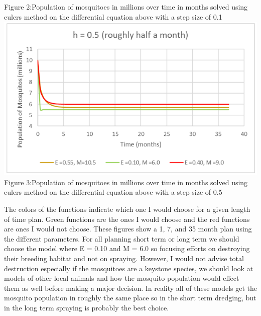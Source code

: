 \documentclass[12pt]{article}
\begin{document}
     Figure 2:Population of mosquitoes in millions over time in months solved using eulers method on the differential equation above with a step size of 0.1\\
\centering
     \includegraphics[width=0.8\linewidth]{Screenshot 2025-05-06 230928}\\
     Figure 3:Population of mosquitoes in millions over time in months solved using eulers method on the differential equation above with a step size of 0.5\\
\vspace{1in}
\raggedright
The colors of the functions indicate which one I would choose for a given length of time plan. Green functions are the ones I would choose and the red functions are ones I would not choose. These figures show a 1, 7, and 35 month plan using the different parameters. For all planning short term or long term we should choose the model where E = 0.10 and M = 6.0 so focusing efforts on destroying their breeding habitat and not on spraying. However, I would not advise total destruction especially if the mosquitoes are a keystone species, we should look at models of other local animals and how the mosquito population would effect them as well before making a major decision. In reality all of these models get the mosquito population in roughly the same place so in the short term dredging, but in the long term spraying is probably the best choice.
\end{document}
